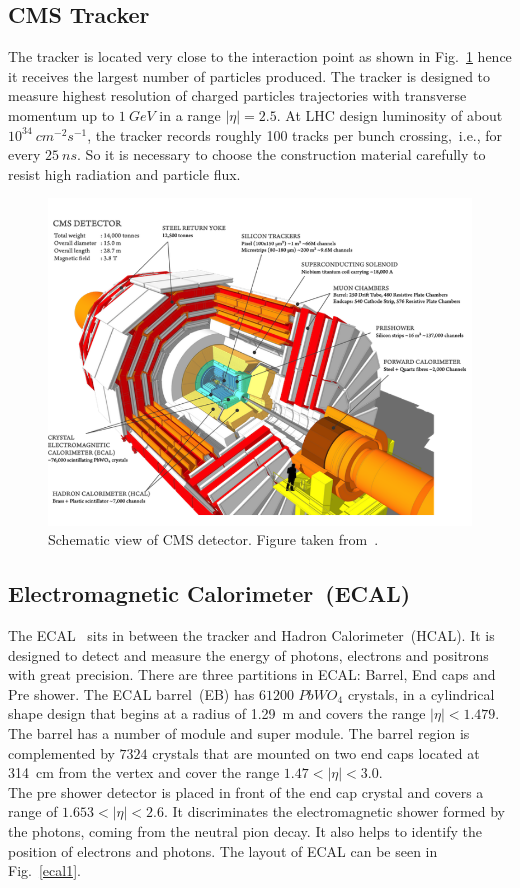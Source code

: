 \subsection{CMS Tracker}
The tracker is located very close to the interaction point as shown in Fig.~\ref{CMS_schematic} hence it receives the largest number of particles produced. The tracker is designed to measure highest resolution of charged particles trajectories with transverse momentum up to $1~GeV$ in a range $|\eta|=2.5$. At LHC 
design luminosity of about $10^{34}~cm^{-2}s^{-1}$, the tracker records roughly 100 tracks per bunch crossing,~i.e., for every $25~ns$. So it is necessary to choose the construction material carefully to resist high radiation and particle flux.
\begin{figure}
\centering
\includegraphics[scale=0.5]{chapter2/cms-schematic.png}
\caption{Schematic view of CMS detector. Figure taken from~\cite{Layter:343814}.}
\label{CMS_schematic}
\end{figure}

\subsection{Electromagnetic Calorimeter~(ECAL)}
The ECAL~\cite{CERN-LHCC-97-033} sits in between the tracker and Hadron Calorimeter~(HCAL). It is designed to detect and measure the energy of photons, electrons and positrons with great precision. There are three partitions in ECAL: Barrel, End caps and Pre shower. The ECAL barrel~(EB) has $61200$ $PbWO_{4}$ crystals, in a cylindrical shape design that begins at a radius of 1.29~m  and covers the range $|\eta| < 1.479$. The barrel has a number of module and super module. The barrel region is complemented by $7324$ crystals that are mounted on two end caps located at 314~cm from the vertex and cover the range $1.47 < |\eta| < 3.0$.\\
The pre shower detector is placed in front of the end cap crystal and covers a range of $1.653 < |\eta| < 2.6$. It discriminates the electromagnetic shower formed by the photons, coming from the neutral pion decay. It also helps to identify the position of electrons and photons. The layout of ECAL can be seen in Fig.~\ref{ecal1}.

